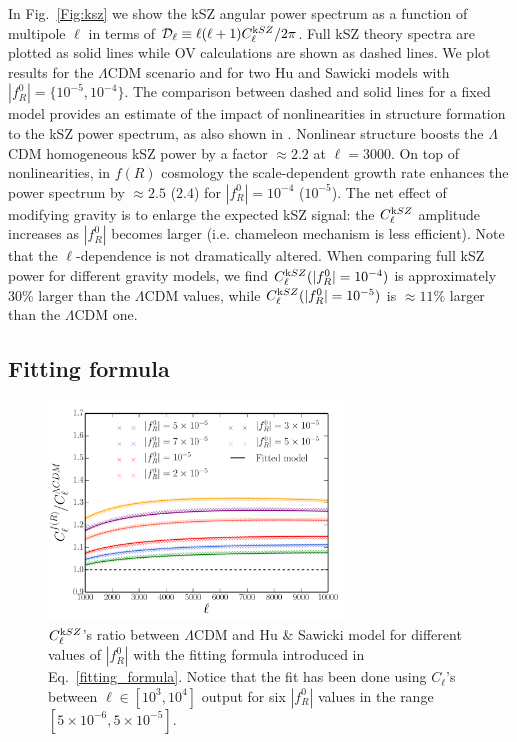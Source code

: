 In Fig.~\eqref{Fig:ksz} we show the kSZ angular power spectrum  as a function of multipole $\ell$ in terms of $\mathcal{D}_{\ell} \equiv \ell(\ell+1)C^{\rm kSZ}_{\ell}/2\pi$. Full kSZ theory spectra are plotted as solid lines while OV calculations are shown as dashed lines. We plot results for the $\Lambda$CDM scenario and for two Hu and Sawicki models with $|f^0_R|=\{10^{-5},10^{-4}\}$. The comparison between dashed and solid lines for a fixed model provides an estimate of the impact of nonlinearities in structure formation to the kSZ power spectrum, as also shown in \cite{Shaw2012,Ma2014a}. Nonlinear structure boosts the $\Lambda$CDM homogeneous kSZ power by a factor $\approx 2.2$ at $\ell=3000$. On top of nonlinearities, in $f(R)$ cosmology the scale-dependent growth rate enhances the power spectrum by $\approx 2.5$ ($2.4$) for $|f^0_R|=10^{-4}$ ($10^{-5}$). The net effect of modifying gravity is to enlarge the expected kSZ signal: the $C^{\rm kSZ}_{\ell}$ amplitude increases as $|f^0_R|$ becomes larger (i.e. chameleon mechanism is less efficient). Note that the $\ell$-dependence is not dramatically altered. When comparing full kSZ power for different gravity models, we find $C^{\rm kSZ}_{\ell}(|f^0_R|=10^{-4})$ is approximately 30\% larger than the $\Lambda$CDM values, while $C^{\rm kSZ}_{\ell}(|f^0_R|=10^{-5})$ is $\approx11\%$ larger than the $\Lambda$CDM one.

\subsection{Fitting formula} 
%
 \begin{figure}[th]
\begin{center}
\includegraphics[width=0.7\textwidth]{Chapter6/Images/cl_ratio_alternative}
\caption{ $C_{\ell}^{\rm kSZ}$'s ratio between $\Lambda$CDM and Hu \& Sawicki model for different values of $|f_R^0|$ with the fitting formula introduced in Eq.~\eqref{fitting_formula}. Notice that the fit has been done using $C_{\ell}$'s between $\ell \in [10^3,10^4]$ output for six $|f^0_R|$ values in the range $[5 \times 10^{-6},5\times10^{-5}]$.} 
\label{Fig:cl_ratio}
\end{center}
\end{figure}
%


